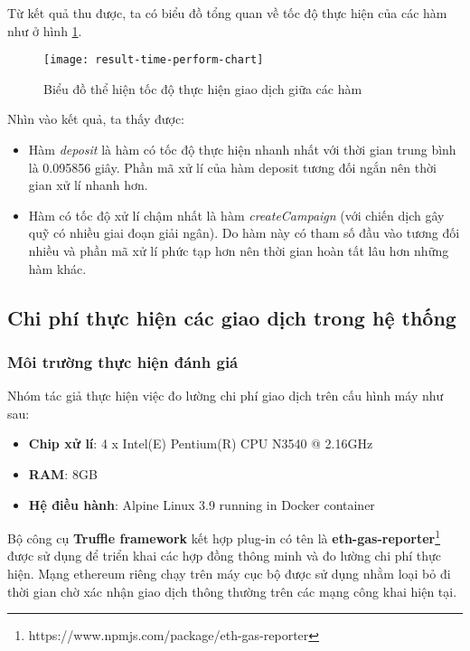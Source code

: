 \documentclass[../main-report.tex]{subfiles}
\begin{document}
Từ kết quả thu được, ta có biểu đồ tổng quan về tốc độ thực hiện của các hàm như ở hình \ref{fig:result-time-perform-chart}.

\begin{figure}[ht!]
\begin{center}
\label{fig:result-time-perform-chart}
\texttt{[image: result-time-perform-chart]}
\caption{Biểu đồ thể hiện tốc độ thực hiện giao dịch giữa các hàm}
\end{center}
\end{figure}

Nhìn vào kết quả, ta thấy được:

\begin{itemize}
\item Hàm \textit{deposit} là hàm có tốc độ thực hiện nhanh nhất với thời gian trung bình là 0.095856 giây. Phần mã xử lí của hàm deposit tương đối ngắn nên thời gian xử lí nhanh hơn.
\item Hàm có tốc độ xử lí chậm nhất là hàm \textit{createCampaign} (với chiến dịch gây quỹ có nhiều giai đoạn giải ngân). Do hàm này có tham số đầu vào tương đối nhiều và phần mã xử lí phức tạp hơn nên thời gian hoàn tất lâu hơn những hàm khác.
\end{itemize}
\subsection{Chi phí thực hiện các giao dịch trong hệ thống}
\subsubsection{Môi trường thực hiện đánh giá}
Nhóm tác giả thực hiện việc đo lường chi phí giao dịch trên cấu hình máy như sau:

\begin{itemize}
\item \textbf{Chip xử lí}: 4 x Intel(E) Pentium(R) CPU N3540 @ 2.16GHz
\item \textbf{RAM}: 8GB
\item \textbf{Hệ điều hành}: Alpine Linux 3.9 running in Docker container
\end{itemize}

Bộ công cụ \textbf{Truffle framework} kết hợp plug-in có tên là \textbf{eth-gas-reporter}\footnote{https://www.npmjs.com/package/eth-gas-reporter} được sử dụng để triển khai các hợp đồng thông minh và đo lường chi phí thực hiện. Mạng ethereum riêng chạy trên máy cục bộ được sử dụng nhằm loại bỏ đi thời gian chờ xác nhận giao dịch thông thường trên các mạng công khai hiện tại.
\end{document}
